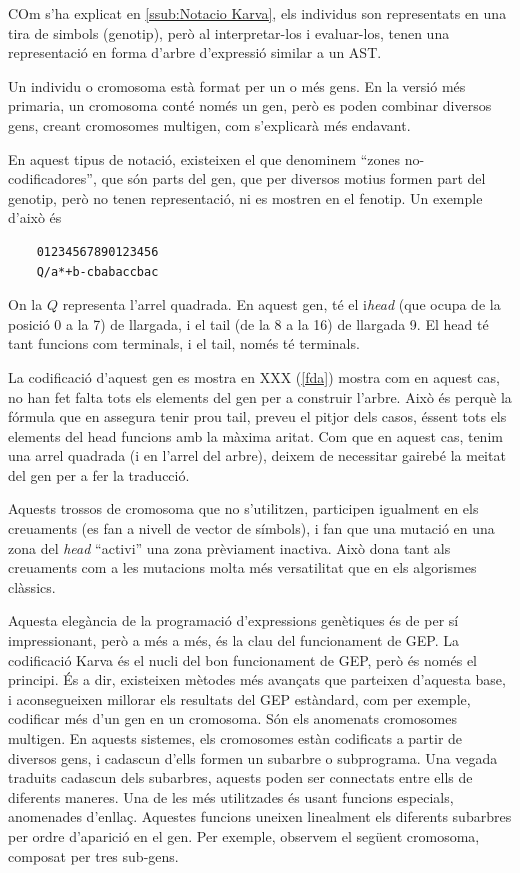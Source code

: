 COm s'ha explicat en \ref{ssub:Notacio Karva}, els individus son representats en
una tira de simbols (genotip), però al interpretar-los i evaluar-los, tenen una
representació en forma d'arbre d'expressió similar a un AST.

Un individu o cromosoma està format per un o més gens.  En la versió més
primaria, un cromosoma conté només un gen, però es poden combinar diversos gens,
creant cromosomes multigen, com s'explicarà més endavant.

En aquest tipus de notació, existeixen el que denominem ``zones
no-codificadores'', que són parts del gen, que per diversos motius formen part
del genotip, però no tenen representació, ni es mostren en el fenotip.  Un
exemple d'això és


\begin{verbatim}
	01234567890123456 	 
	Q/a*+b-cbabaccbac
\end{verbatim}

On la $Q$ representa l'arrel quadrada.  En aquest gen, té el i\emph{head} (que ocupa
de la posició 0 a la 7) de llargada, i el tail (de la 8 a la 16) de llargada 9.
El head té tant funcions com terminals, i el tail, només té terminals.

La codificació d'aquest gen es mostra en XXX (\ref{fda}) mostra com en aquest cas,
no han fet falta tots els elements del gen per a construir l'arbre.  Això és
perquè la fórmula que en assegura tenir prou tail, preveu el pitjor dels casos,
éssent tots els elements del head funcions amb la màxima aritat.  Com que en
aquest cas, tenim una arrel quadrada (i en l'arrel del arbre), deixem de
necessitar gairebé la meitat del gen per a fer la traducció.

Aquests trossos de cromosoma que no s'utilitzen, participen igualment en els
creuaments (es fan a nivell de vector de símbols), i fan que una mutació en una
zona del \emph{head} ``activi'' una zona prèviament inactiva.  Això dona tant
als creuaments com a les mutacions molta més versatilitat que en els algorismes
clàssics.

Aquesta elegància de la programació d'expressions genètiques és de per
sí impressionant, però a més a més, és la clau del funcionament de GEP.
La codificació Karva és el nucli del bon funcionament de GEP, però és només el
principi.  És a dir, existeixen mètodes més avançats que parteixen d'aquesta
base, i aconsegueixen millorar els resultats del GEP estàndard, com per exemple,
codificar més d'un gen en un cromosoma. Són els anomenats cromosomes multigen.
En aquests sistemes, els cromosomes estàn codificats a partir de diversos gens,
i cadascun d'ells formen un subarbre o subprograma.  Una vegada traduits
cadascun dels subarbres, aquests poden ser connectats entre ells de diferents
maneres.  Una de les més utilitzades és usant funcions especials, anomenades
d'enllaç. Aquestes funcions uneixen linealment els diferents subarbres per ordre
d'aparició en el gen.  Per exemple, observem el següent cromosoma, composat per
tres sub-gens.

